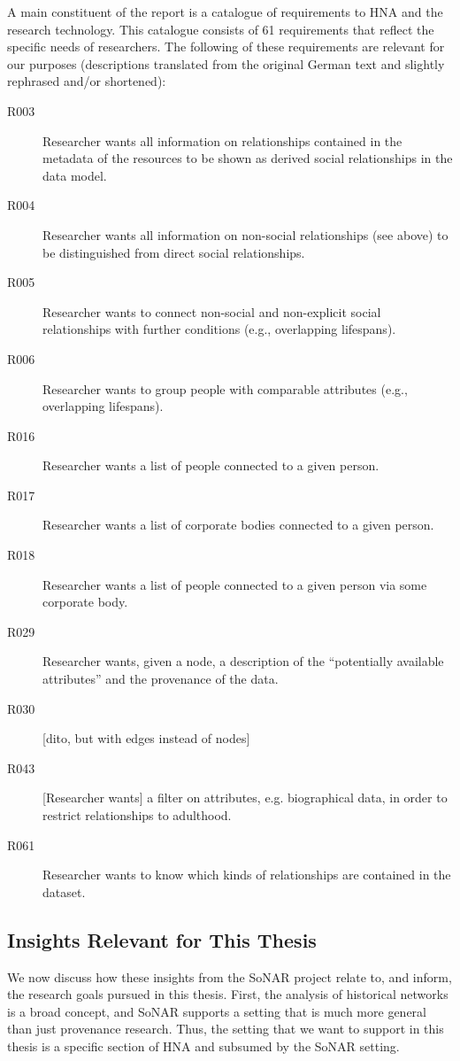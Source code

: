 A main constituent of the report is a catalogue of requirements
to HNA and the research technology. This catalogue consists of 61
requirements that reflect the specific needs of researchers.
The following of these requirements are relevant for our purposes
(descriptions translated from the original German text and slightly rephrased and/or shortened):
%
\begin{description}
  \item[R003]
    Researcher wants all information on relationships contained in the metadata of the resources
    to be shown as derived social relationships in the data model.
  \item[R004]
    Researcher wants all information on non-social
    relationships (see above) to be distinguished from direct social relationships.
  \item[R005]
    Researcher wants to connect non-social and non-explicit social relationships
    with further conditions (e.g., overlapping lifespans).
  \item[R006]
    Researcher wants to group people with comparable attributes (e.g., overlapping lifespans).
  \item[R016]
    Researcher wants a list of people connected to a given person.
  \item[R017]
    Researcher wants a list of corporate bodies connected to a given person.
  \item[R018]
    Researcher wants a list of people connected to a given person via some corporate body.
  \item[R029]
    Researcher wants, given a node, a description of the \enquote{potentially available attributes}
    and the provenance of the data.
  \item[R030]
    [dito, but with edges instead of nodes]
  \item[R043]
    [Researcher wants] a filter on attributes, e.g. biographical data, in order to
    restrict relationships to adulthood.
  \item[R061]
    Researcher wants to know which kinds of relationships are contained in the dataset.
\end{description}

\subsection{Insights Relevant for This Thesis}

We now discuss how these insights from the SoNAR project relate to, and inform, the research goals
pursued in this thesis.
First, the analysis of historical networks is a broad concept, and SoNAR supports a setting
that is much more general than just provenance research.
Thus, the setting that we want to support in this thesis is a specific section of HNA and subsumed 
by the SoNAR setting.

